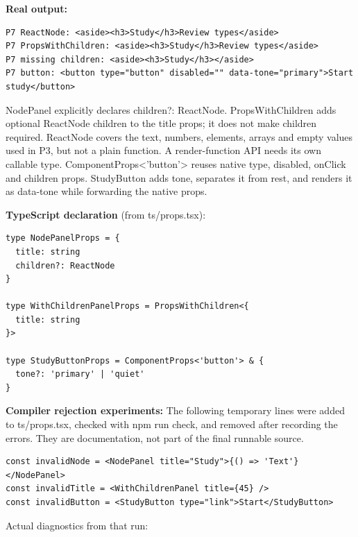 \documentclass[10pt,a4paper]{article}
\begin{document}

\textbf{Real output:}

\begin{lstlisting}[language={}]
P7 ReactNode: <aside><h3>Study</h3>Review types</aside>
P7 PropsWithChildren: <aside><h3>Study</h3>Review types</aside>
P7 missing children: <aside><h3>Study</h3></aside>
P7 button: <button type="button" disabled="" data-tone="primary">Start study</button>
\end{lstlisting}

NodePanel explicitly declares children?: ReactNode. PropsWithChildren adds optional ReactNode children to the title props; it does not make children required. ReactNode covers the text, numbers, elements, arrays and empty values used in P3, but not a plain function. A render-function API needs its own callable type. ComponentProps<'button'> reuses native type, disabled, onClick and children props. StudyButton adds tone, separates it from rest, and renders it as data-tone while forwarding the native props.


\textbf{TypeScript declaration} (from ts/props.tsx):

\begin{lstlisting}[language=GuideJS]
type NodePanelProps = {
  title: string
  children?: ReactNode
}

type WithChildrenPanelProps = PropsWithChildren<{
  title: string
}>

type StudyButtonProps = ComponentProps<'button'> & {
  tone?: 'primary' | 'quiet'
}
\end{lstlisting}

\textbf{Compiler rejection experiments:} The following temporary lines were added to ts/props.tsx, checked with npm run check, and removed after recording the errors. They are documentation, not part of the final runnable source.

\begin{lstlisting}[language=GuideJS]
const invalidNode = <NodePanel title="Study">{() => 'Text'}</NodePanel>
const invalidTitle = <WithChildrenPanel title={45} />
const invalidButton = <StudyButton type="link">Start</StudyButton>
\end{lstlisting}


Actual diagnostics from that run:
\end{document}
